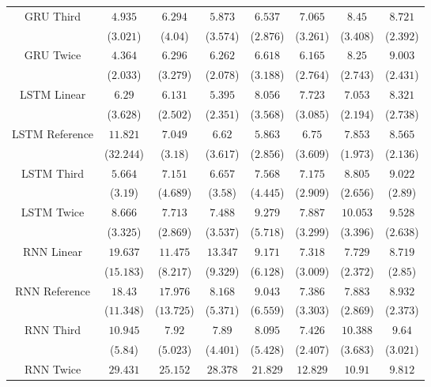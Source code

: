 \begin{table}[!ht]
{\begin{tabular}{|c|c|c|c|c|c|c|c|}
			\multirow{2}{*}{GRU Third} & $4.935$ & $6.294$ & $5.873$ & $6.537$ & $7.065$ & $8.45$ & $8.721$ \\
			 & ($3.021$) & ($4.04$) & ($3.574$) & ($2.876$) & ($3.261$) & ($3.408$) & ($2.392$) \\ \hline
			\multirow{2}{*}{GRU Twice} & $4.364$ & $6.296$ & $6.262$ & $6.618$ & $6.165$ & $8.25$ & $9.003$ \\
			 & ($2.033$) & ($3.279$) & ($2.078$) & ($3.188$) & ($2.764$) & ($2.743$) & ($2.431$) \\ \hline
			\multirow{2}{*}{LSTM Linear} & $6.29$ & $6.131$ & $5.395$ & $8.056$ & $7.723$ & $7.053$ & $8.321$ \\
			 & ($3.628$) & ($2.502$) & ($2.351$) & ($3.568$) & ($3.085$) & ($2.194$) & ($2.738$) \\ \hline
			\multirow{2}{*}{LSTM Reference} & $11.821$ & $7.049$ & $6.62$ & $5.863$ & $6.75$ & $7.853$ & $8.565$ \\
			 & ($32.244$) & ($3.18$) & ($3.617$) & ($2.856$) & ($3.609$) & ($1.973$) & ($2.136$) \\ \hline
			\multirow{2}{*}{LSTM Third} & $5.664$ & $7.151$ & $6.657$ & $7.568$ & $7.175$ & $8.805$ & $9.022$ \\
			 & ($3.19$) & ($4.689$) & ($3.58$) & ($4.445$) & ($2.909$) & ($2.656$) & ($2.89$) \\ \hline
			\multirow{2}{*}{LSTM Twice} & $8.666$ & $7.713$ & $7.488$ & $9.279$ & $7.887$ & $10.053$ & $9.528$ \\
			 & ($3.325$) & ($2.869$) & ($3.537$) & ($5.718$) & ($3.299$) & ($3.396$) & ($2.638$) \\ \hline
			\multirow{2}{*}{RNN Linear} & $19.637$ & $11.475$ & $13.347$ & $9.171$ & $7.318$ & $7.729$ & $8.719$ \\
			 & ($15.183$) & ($8.217$) & ($9.329$) & ($6.128$) & ($3.009$) & ($2.372$) & ($2.85$) \\ \hline
			\multirow{2}{*}{RNN Reference} & $18.43$ & $17.976$ & $8.168$ & $9.043$ & $7.386$ & $7.883$ & $8.932$ \\
			 & ($11.348$) & ($13.725$) & ($5.371$) & ($6.559$) & ($3.303$) & ($2.869$) & ($2.373$) \\ \hline
			\multirow{2}{*}{RNN Third} & $10.945$ & $7.92$ & $7.89$ & $8.095$ & $7.426$ & $10.388$ & $9.64$ \\
			 & ($5.84$) & ($5.023$) & ($4.401$) & ($5.428$) & ($2.407$) & ($3.683$) & ($3.021$) \\ \hline
			\multirow{2}{*}{RNN Twice} & $29.431$ & $25.152$ & $28.378$ & $21.829$ & $12.829$ & $10.91$ & $9.812$ \\

\end{tabular}}
\end{table}
